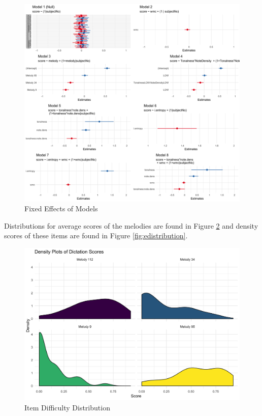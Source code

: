 \documentclass[12pt,]{book}
\begin{document}
\begin{figure}

{\centering \includegraphics[width=1\linewidth]{img/me_grid} 

}

\caption{Fixed Effects of Models}\label{fig:megrid}
\end{figure}

Distributions for average scores of the melodies are found in Figure \ref{fig:eboxplot} and density scores of these items are found in Figure \ref{fig:edistribution}.

\begin{figure}

{\centering \includegraphics[width=1\linewidth]{img/melody_difficulty} 

}

\caption{Item Difficulty Distribution}\label{fig:eboxplot}
\end{figure}
\end{document}
